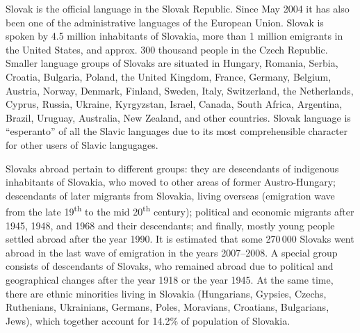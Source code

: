 \begin{multicols}{2}
Slovak is the official language in the Slovak Republic. Since May 2004 it has also been one of the administrative languages of the European Union. Slovak is spoken by 4.5 million inhabitants of Slovakia, more than 1 million emigrants in the United States, and approx. 300 thousand people in the Czech Republic. Smaller language groups of Slovaks are situated in Hungary, Romania, Serbia, Croatia, Bulgaria, Poland, the United Kingdom, France, Germany, Belgium, Austria, Norway, Denmark, Finland, Sweden, Italy, Switzerland, the Netherlands, Cyprus, Russia, Ukraine, Kyrgyzstan, Israel, Canada, South Africa, Argentina, Brazil, Uruguay, Australia, New Zealand,  and other countries. Slovak language is ``esperanto'' of all the Slavic languages due to its most comprehensible character for other users of Slavic langugages.


 Slovaks abroad pertain to different groups: they are descendants of indigenous
inhabitants of Slovakia, who moved to other areas of former Austro-Hungary;
descendants of later migrants from Slovakia, living overseas (emigration wave
from the late 19\textsuperscript{th} to the mid 20\textsuperscript{th}
century); political and economic migrants after 1945, 1948, and 1968 and their
descendants; and finally, mostly young people settled abroad after the year
1990. It is estimated that some 270\,000 Slovaks went abroad in the last wave
of emigration in the years 2007–2008. A special group consists of descendants
of  Slovaks, who remained abroad due to political and geographical changes
after the year 1918 or the year 1945. At the same time, there are ethnic
minorities living in Slovakia (Hungarians, Gypsies, Czechs, Ruthenians,
Ukrainians, Germans, Poles, Moravians, Croatians, Bulgarians, Jews), which
together account for 14.2\% of population of Slovakia.


\end{multicols}
